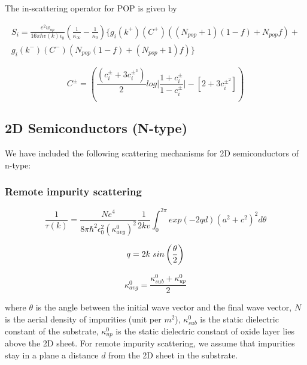 \documentclass[12pt]{article}
\begin{document}
The in-scattering operator for POP is given by \cite{ramu2011thermoelectric}

\begin{multline}
    S_i = \frac{e^2 w_{op}}{16\pi \hbar v(k) \epsilon_0}  \left( \frac{1}{\kappa_\infty} - \frac{1}{\kappa_0} \right) \{ g_i(k^+) (C^+)  \left( (N_{pop}+1)(1-f) + N_{pop} f \right) + \\ g_i(k^-) (C^-) \left( N_{pop}(1-f) + (N_{pop}+1) f \right) \}
\label{Si_p}
\end{multline}

\begin{equation}
C^{\pm} = \left( \frac{(c_i^{\pm}+3c_i^{\pm^3})}{2} log \Bigg|  \frac{1+c_i^{\pm}}{1-c_i^{\pm}}\Bigg|  - \left[ 2 + 3c_i^{\pm^2} \right] \right) 
\label{C_pm}
\end{equation}


\subsection{2D Semiconductors (N-type)}
We have included the following scattering mechanisms for 2D semiconductors of n-type: 

\subsubsection{Remote impurity scattering}
\begin{equation}
\frac{1}{\tau(k)} = \frac{N e^4}{8 \pi \hbar^2 \epsilon_0^2 (\kappa_{avg}^{0})^2} \frac{1}{2kv} \int_0^{2\pi} exp(-2qd) (a^2 + c^2)^2 d\theta
    \label{ii_2d}
\end{equation}

\begin{equation}
q = 2 k \hspace{0.1cm} sin \left( \frac{\theta}{2} \right)
\label{change}
\end{equation}

\begin{equation}
\kappa_{avg}^0 = \frac{\kappa_{sub}^0 + \kappa_{up}^0}{2} 
\end{equation}

where $\theta $ is the angle between the initial wave vector and the final wave vector, $N$ is the aerial density of impurities (unit per $m^2$),   $\kappa_{sub}^0$ is the static dielectric constant of the substrate, $\kappa_{up}^0$ is the static dielectric constant of oxide layer lies above the 2D sheet. For remote impurity scattering, we assume that impurities stay in a plane a distance $d$ from the 2D sheet in the substrate.
\end{document}
